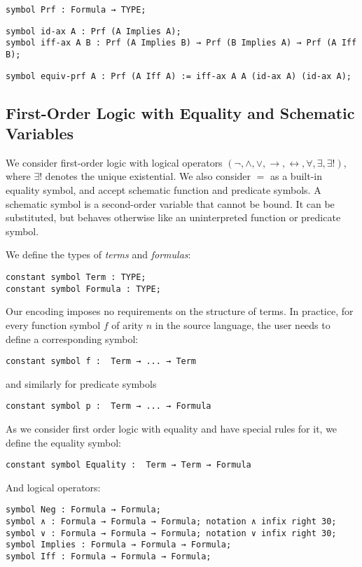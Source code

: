 \documentclass{article}
\begin{document}
	\begin{lstlisting}[language=Dialekto, firstnumber=last]
symbol Prf : Formula → TYPE;
	\end{lstlisting}
	
	\begin{lstlisting}[language=Dialekto, firstnumber=last]
symbol id-ax A : Prf (A Implies A);
symbol iff-ax A B : Prf (A Implies B) → Prf (B Implies A) → Prf (A Iff B);
	\end{lstlisting}
	
	
	\begin{lstlisting}[language=Dialekto, firstnumber=last]
symbol equiv-prf A : Prf (A Iff A) := iff-ax A A (id-ax A) (id-ax A);
	\end{lstlisting}

\newpage	
	
	\subsection{First-Order Logic with Equality and Schematic Variables}\label{SSect:FOL}
	We consider first-order logic with logical operators $(\neg, \land, \lor, \rightarrow, \leftrightarrow, \forall, \exists, \exists !)$, where $\exists !$ denotes the unique existential. We also consider $=$ as a built-in equality symbol, and accept schematic function and predicate symbols. A schematic symbol is a second-order variable that cannot be bound. It can be substituted, but behaves otherwise like an uninterpreted function or predicate symbol.
	
	We define the types of \textit{terms} and \textit{formulas}:

	\begin{lstlisting}[language=Dialekto]
constant symbol Term : TYPE;
constant symbol Formula : TYPE;
	\end{lstlisting}
	Our encoding imposes no requirements on the structure of terms. In practice,  for every function symbol $f$ of arity $n$ in the source language, the user needs to define a corresponding symbol:
	\begin{lstlisting}[language=Dialekto]
constant symbol f :  Term → ... → Term
	\end{lstlisting}
	and similarly for predicate symbols
	\begin{lstlisting}[language=Dialekto]
constant symbol p :  Term → ... → Formula
	\end{lstlisting}
	As we consider first order logic with equality and have special rules for it, we define the equality symbol:
	\begin{lstlisting}[language=Dialekto]
constant symbol Equality :  Term → Term → Formula
	\end{lstlisting}
	And logical operators:
	\begin{lstlisting}[language=Dialekto]
symbol Neg : Formula → Formula;
symbol ∧ : Formula → Formula → Formula; notation ∧ infix right 30;
symbol ∨ : Formula → Formula → Formula; notation ∨ infix right 30;
symbol Implies : Formula → Formula → Formula;
symbol Iff : Formula → Formula → Formula;
\end{lstlisting}
\end{document}
